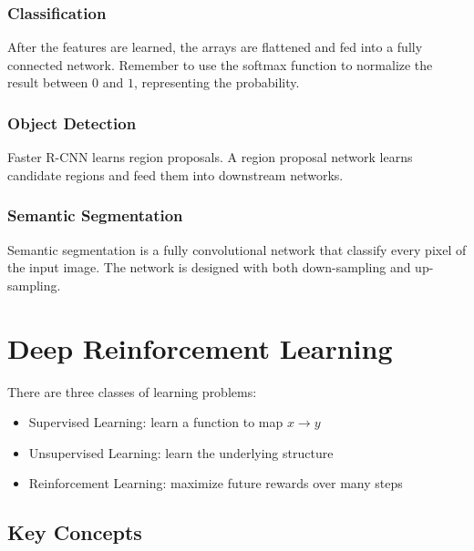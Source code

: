 \documentclass[12pt, a4paper, oneside]{article}
\begin{document}
\subsubsection{Classification}

After the features are learned, the arrays are flattened and fed into a fully connected network. Remember to use the softmax function to normalize the result between $0$ and $1$, representing the probability.

\subsubsection{Object Detection}

Faster R-CNN learns region proposals. A region proposal network learns candidate regions and feed them into downstream networks.

\subsubsection{Semantic Segmentation}

Semantic segmentation is a fully convolutional network that classify every pixel of the input image. The network is designed with both down-sampling and up-sampling.

\section{Deep Reinforcement Learning}

There are three classes of learning problems:
\begin{itemize}
    \item Supervised Learning: learn a function to map $x\rightarrow y$
    \item Unsupervised Learning: learn the underlying structure
    \item Reinforcement Learning: maximize future rewards over many steps
\end{itemize}

\subsection{Key Concepts}
\end{document}
